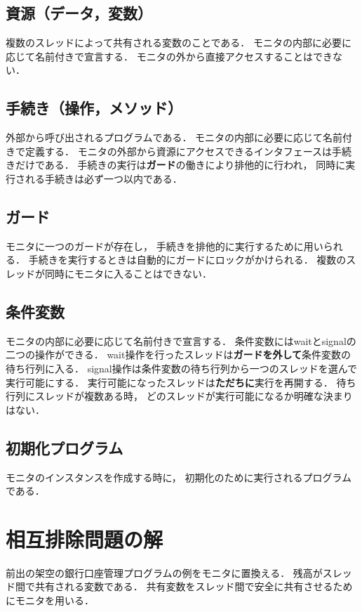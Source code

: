 \subsection{資源（データ，変数）}
複数のスレッドによって共有される変数のことである．
モニタの内部に必要に応じて名前付きで宣言する．
モニタの外から直接アクセスすることはできない．

\subsection{手続き（操作，メソッド）}
外部から呼び出されるプログラムである．
モニタの内部に必要に応じて名前付きで定義する．
モニタの外部から資源にアクセスできるインタフェースは手続きだけである．
手続きの実行は{\bf ガード}の働きにより排他的に行われ，
同時に実行される手続きは必ず一つ以内である．

\subsection{ガード}
モニタに一つのガードが存在し，
手続きを排他的に実行するために用いられる．
手続きを実行するときは自動的にガードにロックがかけられる．
複数のスレッドが同時にモニタに入ることはできない．

\subsection{条件変数}
モニタの内部に必要に応じて名前付きで宣言する．
条件変数にはwaitとsignalの二つの操作ができる．
wait操作を行ったスレッドは{\bf ガードを外して}条件変数の待ち行列に入る．
signal操作は条件変数の待ち行列から一つのスレッドを選んで実行可能にする．
実行可能になったスレッドは{\bf ただちに}実行を再開する．
待ち行列にスレッドが複数ある時，
どのスレッドが実行可能になるか明確な決まりはない．

\subsection{初期化プログラム}
モニタのインスタンスを作成する時に，
初期化のために実行されるプログラムである．

\section{相互排除問題の解}
前出の架空の銀行口座管理プログラムの例をモニタに置換える．
残高がスレッド間で共有される変数である．
共有変数をスレッド間で安全に共有させるためにモニタを用いる．

